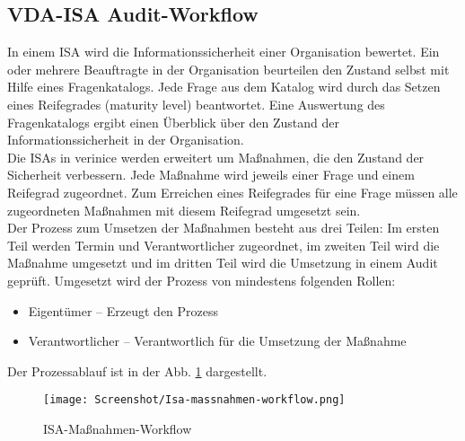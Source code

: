 \documentclass[a4paper,10pt]{book}
\begin{document}
\subsection{VDA-ISA Audit-Workflow}
In einem ISA wird die Informationssicherheit einer Organisation bewertet. Ein oder mehrere Beauftragte in der Organisation beurteilen den
Zustand selbst mit Hilfe eines Fragenkatalogs. Jede Frage aus dem Katalog wird durch das Setzen eines Reifegrades (maturity level) beantwortet.
Eine Auswertung des Fragenkatalogs ergibt einen Überblick über den Zustand der Informationssicherheit in der Organisation.
\newline\\
Die ISAs in verinice werden erweitert um Maßnahmen, die den Zustand der Sicherheit verbessern. Jede Maßnahme wird jeweils einer Frage und
einem Reifegrad zugeordnet. Zum Erreichen eines Reifegrades für eine Frage müssen alle zugeordneten Maßnahmen mit diesem Reifegrad umgesetzt sein.
\newline\\
Der Prozess zum Umsetzen der Maßnahmen besteht aus drei Teilen: Im ersten Teil werden Termin und Verantwortlicher zugeordnet,
im zweiten Teil wird die Maßnahme umgesetzt und im dritten Teil wird die Umsetzung in einem Audit geprüft. Umgesetzt wird der Prozess von mindestens
folgenden Rollen:
\begin{itemize}
\item Eigentümer – Erzeugt den Prozess
\item Verantwortlicher – Verantwortlich für die Umsetzung der Maßnahme
\end{itemize}
Der Prozessablauf ist in der Abb. \ref{ISA-Massnahmen-Workflow} dargestellt.
\begin{figure}[htb!]
  \centering
  \texttt{[image: Screenshot/Isa-massnahmen-workflow.png]}
  \caption{\label{ISA-Massnahmen-Workflow} ISA-Maßnahmen-Workflow}
\end{figure}
\end{document}
